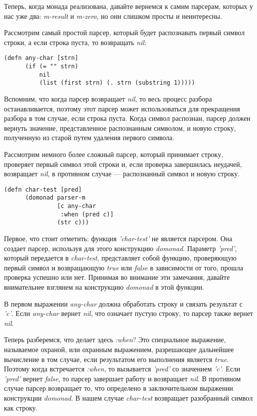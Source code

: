 \documentclass[a4paper,12pt]{article}
\newcommand{\cl}[1] {{\it #1}}
\begin{document}
Теперь, когда монада реализована, давайте вернемся к самим парсерам, которых у нас уже два: \cl{m-result} и \cl{m-zero},
но они слишком просты и неинтересны. 

Рассмотрим самый простой парсер, который будет распознавать первый 
символ строки, а если строка пуста, то возвращать \cl{nil}:

\begin{verbatim}
(defn any-char [strn]
      (if (= "" strn)
          nil
          (list (first strn) (. strn (substring 1)))))
\end{verbatim}

Вспомним, что когда парсер возвращает \cl{nil}, то весь процесс разбора останавливается, поэтому этот парсер
может использоваться для прекращения разбора в том случае, если строка пуста. 
Когда символ распознан, парсер должен вернуть значение, представленное распознанным символом, и новую
строку, полученную из старой путем удаления первого символа. 

Рассмотрим немного более сложный парсер, который принимает строку, проверяет первый символ этой строки 
и, если проверка завершилась неудачей, возвращает \cl{nil}, в противном случае --- распознанный символ и 
новую строку. 

\begin{verbatim}
(defn char-test [pred]
      (domonad parser-m
               [c any-char
                :when (pred c)]
               (str c)))
\end{verbatim}

Первое, что стоит отметить: функция \cl{'char-test'} не является парсером. Она создает парсер, используя
для этого конструкцию \cl{domonad}. Параметр \cl{'pred'}, который передается в \cl{char-test}, представляет собой 
функцию, проверяющую первый символ и возвращающую \cl{true} или \cl{false} в зависимости от того, прошла проверка 
успешно или нет. Принимая во внимание эти замечания, давайте внимательнее взглянем на конструкцию \cl{domonad} в этой функции.

В первом выражении \cl{any-char} должна обработать строку и связать результат с \cl{'c'}. Если \cl{any-char} вернет \cl{nil}, что
означает пустую строку, то парсер также вернет \cl{nil}. 

Теперь разберемся, что делает здесь \cl{:when}? Это специальное выражение, называемое охраной, или охранным выражением,
разрешающее дальнейшее вычисление в том случае, если результатом его выполнения является \cl{true}. Поэтому когда 
встречается \cl{:when}, то вызывается \cl{'pred'} со значением \cl{'c'}. Если \cl{'pred'} вернет \cl{false}, то парсер завершает 
работу и возвращает \cl{nil}. В противном случае парсер возвращает то, что определено в заключительном
выражении конструкции \cl{domonad}. В нашем случае \cl{char-test} возвращает разобранный символ как строку. 
\end{document}
